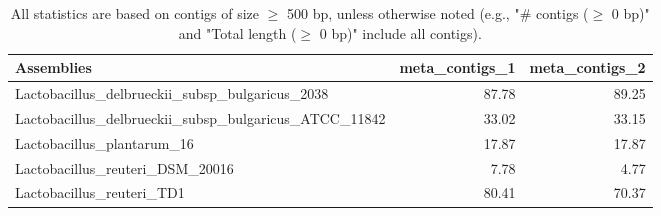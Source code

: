 \documentclass[12pt,a4paper]{article}
\begin{document}
\begin{table}[ht]
\begin{center}
\caption{All statistics are based on contigs of size $\geq$ 500 bp, unless otherwise noted (e.g., "\# contigs ($\geq$ 0 bp)" and "Total length ($\geq$ 0 bp)" include all contigs).}
\begin{tabular}{|l*{2}{|r}|}
\hline
Assemblies & meta\_contigs\_1 & meta\_contigs\_2 \\ \hline
Lactobacillus\_delbrueckii\_subsp\_bulgaricus\_2038 & 87.78 & 89.25 \\ \hline
Lactobacillus\_delbrueckii\_subsp\_bulgaricus\_ATCC\_11842 & 33.02 & 33.15 \\ \hline
Lactobacillus\_plantarum\_16 & 17.87 & 17.87 \\ \hline
Lactobacillus\_reuteri\_DSM\_20016 & 7.78 & 4.77 \\ \hline
Lactobacillus\_reuteri\_TD1 & 80.41 & 70.37 \\ \hline
\end{tabular}
\end{center}
\end{table}
\end{document}
